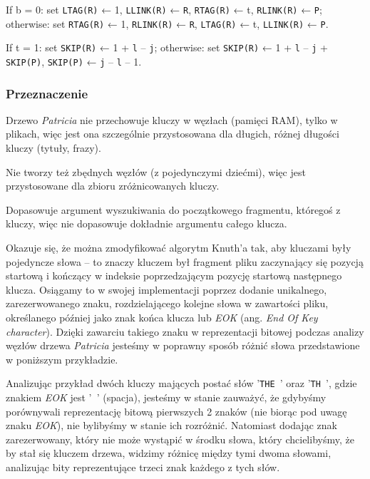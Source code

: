 \begin{displayquote}
		If b = 0: \newline 
		set \texttt{LTAG(R)} ← 1, \texttt{LLINK(R)} ← \texttt{R}, \texttt{RTAG(R)} ← t, \texttt{RLINK(R)} ← \texttt{P}; \newline
		otherwise: \newline 
		set \texttt{RTAG(R)} ← 1, \texttt{RLINK(R)} ← \texttt{R}, \texttt{LTAG(R)} ← t, \texttt{LLINK(R)} ← \texttt{P}. \newline
		
		If t = 1: \newline
		set \texttt{SKIP(R)} ← 1 + \texttt{l} – \texttt{j}; \newline
		otherwise: \newline
		set \texttt{SKIP(R)} ← 1 + \texttt{l} – \texttt{j} + \texttt{SKIP(P)}, \texttt{SKIP(P)} ← \texttt{j} – \texttt{l} – 1.
	\end{displayquote}
	\fi	
	
	\subsubsection{Przeznaczenie}\label{sec:AlgorytmPPrzeznaczenie}
	
	Drzewo \emph{Patricia} nie przechowuje kluczy w węzłach (pamięci RAM), tylko w plikach, więc jest ona szczególnie przystosowana dla długich, różnej długości kluczy (tytuły, frazy). 
	
	Nie tworzy też zbędnych węzłów (z pojedynczymi dziećmi), więc jest przystosowane dla zbioru zróżnicowanych kluczy.
	
	Dopasowuje argument wyszukiwania do początkowego fragmentu, któregoś z kluczy, więc nie dopasowuje dokładnie argumentu całego klucza.
	
	Okazuje się, że można zmodyfikować algorytm Knuth'a tak, aby kluczami były pojedyncze słowa -- to znaczy kluczem był fragment pliku zaczynający się pozycją startową i kończący w indeksie poprzedzającym pozycję startową następnego klucza. Osiągamy to w swojej implementacji poprzez dodanie unikalnego, zarezerwowanego znaku, rozdzielającego kolejne słowa w zawartości pliku, określanego później jako znak końca klucza lub \emph{EOK} (ang. \emph{End Of Key character}). Dzięki zawarciu takiego znaku w reprezentacji bitowej podczas analizy węzłów drzewa \emph{Patricia} jesteśmy w poprawny sposób różnić słowa przedstawione w poniższym przykładzie. 
	
	Analizując przykład dwóch kluczy mających postać słów '\texttt{THE }' oraz '\texttt{TH }', gdzie znakiem \emph{EOK} jest '\texttt{ }' (spacja), jesteśmy w stanie zauważyć, że gdybyśmy porównywali reprezentację bitową pierwszych 2 znaków (nie biorąc pod uwagę znaku \emph{EOK}), nie bylibyśmy w stanie ich rozróżnić. Natomiast dodając znak zarezerwowany, który nie może wystąpić w środku słowa, który chcielibyśmy, że by stał się kluczem drzewa, widzimy różnicę między tymi dwoma słowami, analizując bity reprezentujące trzeci znak każdego z tych słów.
	
